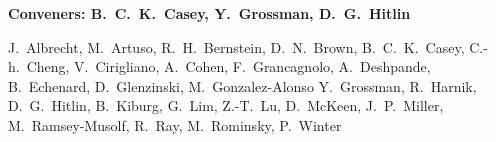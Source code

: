 

\begin{center}

\begin{large} {\bf Conveners: B.~C.~K.~Casey, Y.~Grossman, D.~G.~Hitlin} \end{large}

J.~Albrecht,
M.~Artuso,
R.~H.~Bernstein,
D.~N.~Brown,
B.~C.~K.~Casey,
C.-h.~Cheng,
V.~Cirigliano,
A.~Cohen,
F.~Grancagnolo,
A.~Deshpande,
B.~Echenard,
D.~Glenzinski,
M.~Gonzalez-Alonso
Y.~Grossman,
R.~Harnik,
D.~G.~Hitlin, 
B.~Kiburg,
G.~Lim,
Z.-T.~Lu,
D.~McKeen,
J.~P.~Miller,
M.~Ramsey-Musolf,
R.~Ray,
M.~Rominsky,
P.~Winter 


\end{center}

